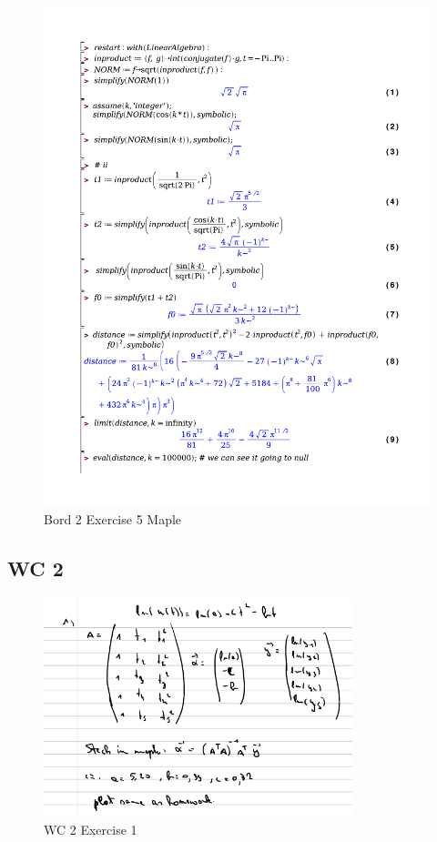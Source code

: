\documentclass[a4paper]{report}
\begin{document}
\begin{figure}[H]
	\centering
	\includegraphics[width=\textwidth]{exercises/bord_2_ex_5.pdf}
	\caption{Bord 2 Exercise 5 Maple}
	\label{fig:bord_2_ex_5_maple}
\end{figure}

\subsection*{WC 2}

\begin{figure}[H]
	\centering
	\includegraphics[width=0.8\textwidth]{images/wc_2_ex_1.png}
	\caption{WC 2 Exercise 1}
	\label{fig:wc_2_ex_1}
\end{figure}
\end{document}
